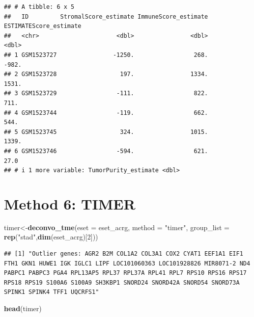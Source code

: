 \documentclass[
  12pt,
]{book}
\newenvironment{Shaded}{\begin{snugshade}}{\end{snugshade}}
\newcommand{\AttributeTok}[1]{\textcolor[rgb]{0.13,0.29,0.53}{#1}}
\newcommand{\DecValTok}[1]{\textcolor[rgb]{0.00,0.00,0.81}{#1}}
\newcommand{\FunctionTok}[1]{\textcolor[rgb]{0.13,0.29,0.53}{\textbf{#1}}}
\newcommand{\NormalTok}[1]{#1}
\newcommand{\OtherTok}[1]{\textcolor[rgb]{0.56,0.35,0.01}{#1}}
\newcommand{\StringTok}[1]{\textcolor[rgb]{0.31,0.60,0.02}{#1}}
\theoremstyle{definition}
\theoremstyle{definition}
\theoremstyle{definition}
\theoremstyle{definition}
\theoremstyle{remark}
\begin{document}
\begin{verbatim}
## # A tibble: 6 x 5
##   ID         StromalScore_estimate ImmuneScore_estimate ESTIMATEScore_estimate
##   <chr>                      <dbl>                <dbl>                  <dbl>
## 1 GSM1523727                -1250.                 268.                 -982. 
## 2 GSM1523728                  197.                1334.                 1531. 
## 3 GSM1523729                 -111.                 822.                  711. 
## 4 GSM1523744                 -119.                 662.                  544. 
## 5 GSM1523745                  324.                1015.                 1339. 
## 6 GSM1523746                 -594.                 621.                   27.0
## # i 1 more variable: TumorPurity_estimate <dbl>
\end{verbatim}

\hypertarget{method-6-timer}{%
\section{Method 6: TIMER}\label{method-6-timer}}

\begin{Shaded}
\begin{Highlighting}[]
\NormalTok{timer}\OtherTok{\textless{}{-}}\FunctionTok{deconvo\_tme}\NormalTok{(}\AttributeTok{eset =}\NormalTok{ eset\_acrg, }\AttributeTok{method =} \StringTok{"timer"}\NormalTok{, }\AttributeTok{group\_list =} \FunctionTok{rep}\NormalTok{(}\StringTok{"stad"}\NormalTok{,}\FunctionTok{dim}\NormalTok{(eset\_acrg)[}\DecValTok{2}\NormalTok{]))}
\end{Highlighting}
\end{Shaded}

\begin{verbatim}
## [1] "Outlier genes: AGR2 B2M COL1A2 COL3A1 COX2 CYAT1 EEF1A1 EIF1 FTH1 GKN1 HUWE1 IGK IGLC1 LIPF LOC101060363 LOC101928826 MIR8071-2 ND4 PABPC1 PABPC3 PGA4 RPL13AP5 RPL37 RPL37A RPL41 RPL7 RPS10 RPS16 RPS17 RPS18 RPS19 S100A6 S100A9 SH3KBP1 SNORD24 SNORD42A SNORD54 SNORD73A SPINK1 SPINK4 TFF1 UQCRFS1"
\end{verbatim}

\begin{Shaded}
\begin{Highlighting}[]
\FunctionTok{head}\NormalTok{(timer)}
\end{Highlighting}
\end{Shaded}
\end{document}

